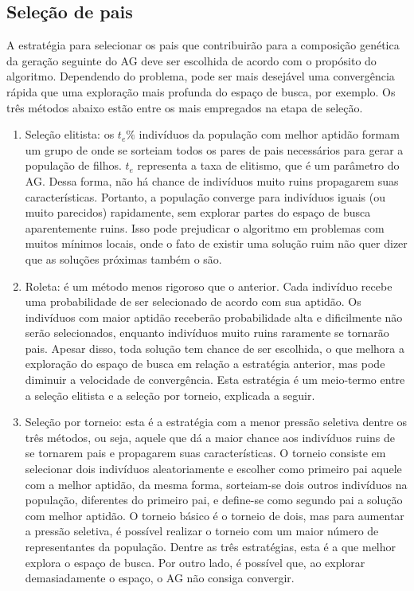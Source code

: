 \subsection{Seleção de pais}
A estratégia para selecionar os pais que contribuirão para a composição genética da geração seguinte do AG deve ser escolhida de acordo com o propósito do algoritmo. Dependendo do problema, pode ser mais desejável uma convergência rápida que uma exploração mais profunda do espaço de busca, por exemplo. Os três métodos abaixo estão entre os mais empregados na etapa de seleção.

\begin{enumerate}
	\item Seleção elitista: os $t_e\%$ indivíduos da população com melhor aptidão formam um grupo de onde se sorteiam todos os pares de pais necessários para gerar a população de filhos. $t_e$ representa a taxa de elitismo, que é um parâmetro do AG. Dessa forma, não há chance de indivíduos muito ruins propagarem suas características. Portanto, a população converge para indivíduos iguais (ou muito parecidos) rapidamente, sem explorar partes do espaço de busca aparentemente ruins. Isso pode prejudicar o algoritmo em problemas com muitos mínimos locais, onde o fato de existir uma solução ruim não quer dizer que as soluções próximas também o são.
	\item Roleta: é um método menos rigoroso que o anterior. Cada indivíduo recebe uma probabilidade de ser selecionado de acordo com sua aptidão. Os indivíduos com maior aptidão receberão probabilidade alta e dificilmente não serão selecionados, enquanto indivíduos muito ruins raramente se tornarão pais. Apesar disso, toda solução tem chance de ser escolhida, o que melhora a exploração do espaço de busca em relação a estratégia anterior, mas pode diminuir a velocidade de convergência. Esta estratégia é um meio-termo entre a seleção elitista e a seleção por torneio, explicada a seguir.
	\item Seleção por torneio: esta é a estratégia com a menor pressão seletiva dentre os três métodos, ou seja, aquele que dá a maior chance aos indivíduos ruins de se tornarem pais e propagarem suas características. O torneio consiste em selecionar dois indivíduos aleatoriamente e escolher como primeiro pai aquele com a melhor aptidão, da mesma forma, sorteiam-se dois outros indivíduos na população, diferentes do primeiro pai, e define-se como segundo pai a solução com melhor aptidão. O torneio básico é o torneio de dois, mas para aumentar a pressão seletiva, é possível realizar o torneio com um maior número de representantes da população. Dentre as três estratégias, esta é a que melhor explora o espaço de busca. Por outro lado, é possível que, ao explorar demasiadamente o espaço, o AG não consiga convergir.
\end{enumerate}

